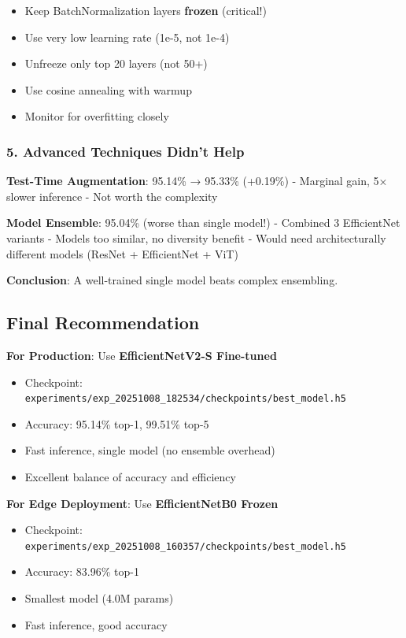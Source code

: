 \documentclass[
  letterpaper,
  DIV=11,
  numbers=noendperiod]{scrartcl}
\providecommand{\tightlist}{%
  \setlength{\itemsep}{0pt}\setlength{\parskip}{0pt}}
\begin{document}
\begin{itemize}
\tightlist
\item
  Keep BatchNormalization layers \textbf{frozen} (critical!)
\item
  Use very low learning rate (1e-5, not 1e-4)
\item
  Unfreeze only top 20 layers (not 50+)
\item
  Use cosine annealing with warmup
\item
  Monitor for overfitting closely
\end{itemize}

\subsubsection{5. Advanced Techniques Didn't
Help}\label{advanced-techniques-didnt-help}

\textbf{Test-Time Augmentation}: 95.14\% → 95.33\% (+0.19\%) - Marginal
gain, 5× slower inference - Not worth the complexity

\textbf{Model Ensemble}: 95.04\% (worse than single model!) - Combined 3
EfficientNet variants - Models too similar, no diversity benefit - Would
need architecturally different models (ResNet + EfficientNet + ViT)

\textbf{Conclusion}: A well-trained single model beats complex
ensembling.

\subsection{Final Recommendation}\label{final-recommendation}

\textbf{For Production}: Use \textbf{EfficientNetV2-S Fine-tuned}

\begin{itemize}
\tightlist
\item
  Checkpoint:
  \texttt{experiments/exp\_20251008\_182534/checkpoints/best\_model.h5}
\item
  Accuracy: 95.14\% top-1, 99.51\% top-5
\item
  Fast inference, single model (no ensemble overhead)
\item
  Excellent balance of accuracy and efficiency
\end{itemize}

\textbf{For Edge Deployment}: Use \textbf{EfficientNetB0 Frozen}

\begin{itemize}
\tightlist
\item
  Checkpoint:
  \texttt{experiments/exp\_20251008\_160357/checkpoints/best\_model.h5}
\item
  Accuracy: 83.96\% top-1
\item
  Smallest model (4.0M params)
\item
  Fast inference, good accuracy
\end{itemize}
\end{document}

